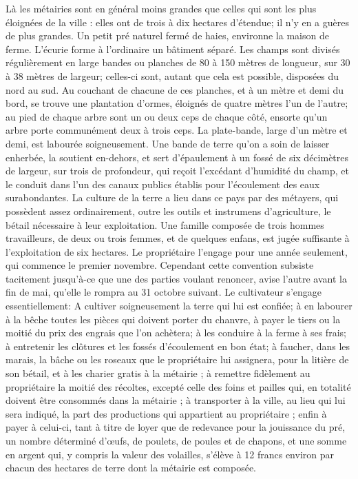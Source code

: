 Là les métairies sont en général moins grandes que celles qui sont les plus éloignées de la ville : elles ont de trois à dix hectares d'étendue; il n'y en a guères de plus grandes.
Un petit pré naturel fermé de haies, environne la maison de ferme. L'écurie forme à l'ordinaire un bâtiment séparé. Les champs sont divisés régulièrement en large bandes ou planches de 80 à 150 mètres de longueur, sur 30 à 38 mètres de largeur; celles-ci sont, autant que cela est possible, disposées du nord au sud.
Au couchant de chacune de ces planches, et à un mètre et demi du bord, se trouve une plantation d'ormes, éloignés de quatre mètres l'un de l'autre; au pied de chaque arbre sont un ou deux ceps de chaque côté, ensorte qu'un arbre porte communément deux à trois ceps.
La plate-bande, large d'un mètre et demi, est labourée soigneusement. Une bande de terre qu'on a soin de laisser enherbée, la soutient en-dehors, et sert d'épaulement à un\setcounter{page}{164} fossé de six décimètres de largeur, sur trois de profondeur, qui reçoit l'excédant d'humidité du champ, et le conduit dans l'un des canaux publics établis pour l'écoulement des eaux surabondantes.
La culture de la terre a lieu dans ce pays par des métayers, qui possèdent assez ordinairement, outre les outils et instrumens d'agriculture, le bétail nécessaire à leur exploitation. Une famille composée de trois hommes travailleurs, de deux ou trois femmes, et de quelques enfans, est jugée suffisante à l'exploitation de six hectares. Le propriétaire l'engage pour une année seulement, qui commence le premier novembre. Cependant cette convention subsiste tacitement jusqu'à-ce que une des parties voulant renoncer, avise l'autre avant la fin de mai, qu'elle le rompra au 31 octobre suivant.
Le cultivateur s'engage essentiellement: A cultiver soigneusement la terre qui lui est confiée; à en labourer à la bêche toutes les pièces qui doivent porter du chanvre, à payer le tiers ou la moitié du prix des engrais que l'on achètera; à les conduire à la ferme à ses frais; à entretenir les clôtures et les fossés d'écoulement en bon état; à faucher, dans les marais, la bâche ou les roseaux que le propriétaire lui assignera, pour\setcounter{page}{165} la litière de son bétail, et à les charier gratis à la métairie ; à remettre fidèlement au propriétaire la moitié des récoltes, excepté celle des foins et pailles qui, en totalité doivent être consommés dans la métairie ; à transporter à la ville, au lieu qui lui sera indiqué, la part des productions qui appartient au propriétaire ; enfin à payer à celui-ci, tant à titre de loyer que de redevance pour la jouissance du pré, un nombre déterminé d’œufs, de poulets, de poules et de chapons, et une somme en argent qui, y compris la valeur des volailles, s’élève à 12 francs environ par chacun des hectares de terre dont la métairie est composée.
